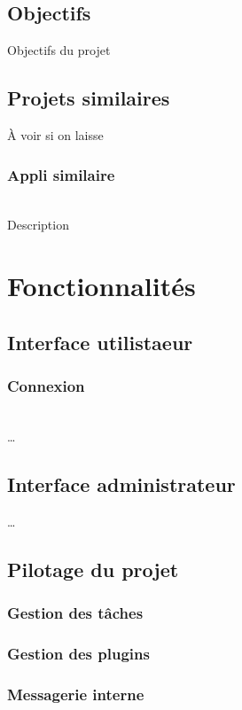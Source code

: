 \documentclass[conference]{IEEEtran}
\begin{document}
\subsection*{Objectifs}

Objectifs du projet

\subsection*{Projets similaires}

À voir si on laisse
\bigskip
\subsubsection{Appli similaire}
\hfil\\
Description

\section{Fonctionnalités}

\subsection{Interface utilistaeur}

\subsubsection{Connexion}
\hfil\\
…

\subsection{Interface administrateur}
…

\subsection{Pilotage du projet}

\subsubsection{Gestion des tâches}

\subsubsection{Gestion des plugins}

\subsubsection{Messagerie interne}
\end{document}
